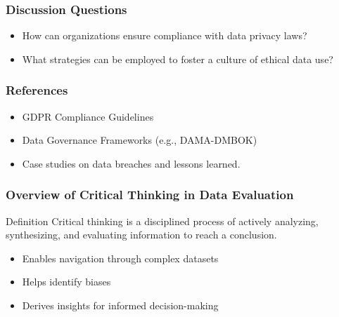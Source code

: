 \documentclass[aspectratio=169]{beamer}
\begin{document}
\begin{frame}[fragile]
    \frametitle{Discussion Questions}
    \begin{itemize}
        \item How can organizations ensure compliance with data privacy laws?
        \item What strategies can be employed to foster a culture of ethical data use?
    \end{itemize}
\end{frame}

\begin{frame}[fragile]
    \frametitle{References}
    \begin{itemize}
        \item GDPR Compliance Guidelines
        \item Data Governance Frameworks (e.g., DAMA-DMBOK)
        \item Case studies on data breaches and lessons learned.
    \end{itemize}
\end{frame}

\begin{frame}[fragile]
    \frametitle{Overview of Critical Thinking in Data Evaluation}
    \begin{block}{Definition}
        Critical thinking is a disciplined process of actively analyzing, synthesizing, and evaluating information to reach a conclusion.
    \end{block}
    \begin{itemize}
        \item Enables navigation through complex datasets
        \item Helps identify biases
        \item Derives insights for informed decision-making
    \end{itemize}
\end{frame}
\end{document}

